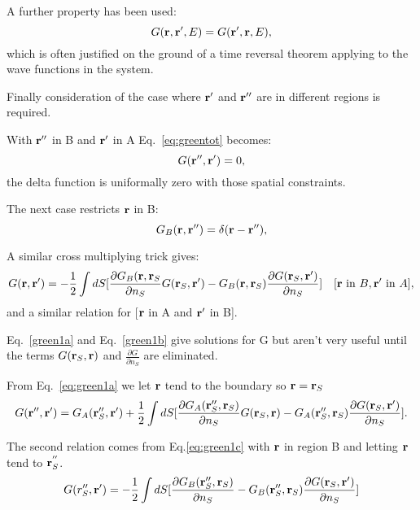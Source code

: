 \documentclass{article}
\def\r{{\bf r}}
\begin{document}
A further property has been used:
%
\begin{equation}
G(\r,\r',E) = G(\r',\r,E),
\end{equation}
%
which is often justified on the ground of a time reversal theorem applying 
to the wave functions in the system.

Finally consideration of the case where $\r'$ and $\r''$ are in different regions is required.

With $\r''$ in B and $\r'$ in A Eq.~\ref{eq:greentot} becomes:
%
\begin{equation}
[-\frac{1}{2}\nabla^{2}_{\r''} + V(\r'') - E]G(\r'',\r') = 0,
\end{equation}
%
the delta function is uniformally zero with those spatial constraints.

The next case restricts $\r$ in B:
%
\begin{equation}
[-\frac{1}{2}\nabla^{2}_{\r''} + V(\r'') - E]G_B(\r,\r'')= \delta(\r-\r''),
\end{equation}
%

A similar cross multiplying trick gives:
%
\begin{equation}
\label{eq:green1c}
G(\r,\r') = -\frac{1}{2} \int dS[\frac{\partial G_{B}(\r, \r_{S}}{\partial n_{S}} G(\r_{S},\r')
- G_{B}(\r, \r_{S})\frac{\partial G(\r_{S},\r')}{\partial n_{S}}] \quad [\r~{\rm in}~B, \r'~{\rm in}~A],
\end{equation}
%
and a similar relation for [$\r$ in A and $\r'$ in B].

Eq.~\ref{green1a} and Eq.~\ref{green1b} give solutions for G but 
aren't very useful until the terms $G(\r_S,\r)$ and 
$\frac{\partial G}{\partial n_{S}}$ are eliminated.

From Eq.~\ref{eq:green1a} we let $\r$ tend to the boundary so $\r = \r_{S}$
%
\begin{equation}
\label{eq:greensys1}
G(\r'',\r') = G_{A}(\r''_{S}, \r') + \frac{1}{2} \int d{S}
[\frac{\partial G_{A}(\r''_{S}, \r_{S})}{\partial n_{S}} G(\r_{S},\r) - 
G_{A}(\r''_{S},\r_{S})\frac{\partial{G(\r_{S}, \r')}}{\partial n_{S}}].
\end{equation}
%

The second relation comes from Eq.\ref{eq:green1c} with 
$\r$ in region B and letting $\r$ tend to $\r^{''}_{S}$.
%
\begin{equation}
\label{eq:greensys2}
G(r''_{S}, \r') = -\frac{1}{2}\int dS [\frac{\partial G_{B}(\r''_{S}, \r_{S})}{\partial n_{S}}
-G_{B}(\r''_{S},\r_{S})\frac{\partial G(\r_{S},\r')}{\partial n_{S}}]
\end{equation}
%
\end{document}
